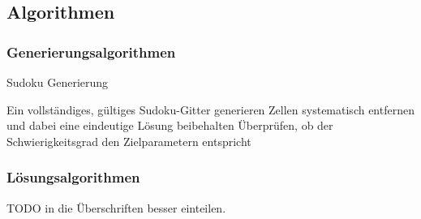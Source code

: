 \documentclass[12pt,a4paper]{article}
\begin{document}




\subsection{Algorithmen}
\subsubsection{Generierungsalgorithmen}
\begin{algorithm}
\caption{Sudoku Generierung}
\begin{algorithmic}[1]
\State Ein vollständiges, gültiges Sudoku-Gitter generieren
\State Zellen systematisch entfernen und dabei eine eindeutige Lösung beibehalten
\State Überprüfen, ob der Schwierigkeitsgrad den Zielparametern entspricht
\end{algorithmic}
\end{algorithm}

\subsubsection{Lösungsalgorithmen}

TODO in die Überschriften besser einteilen.
\end{document}
